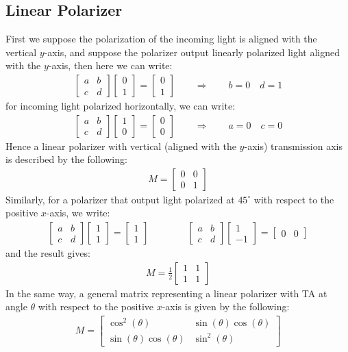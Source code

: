\documentclass[11pt]{book}
\theoremstyle{break}
\theoremstyle{break}
\newcommand{\bmat}[1]{\begin{bmatrix} #1 \end{bmatrix}}
\begin{document}
\subsection{Linear Polarizer}
First we suppose the polarization of the incoming light is aligned with the vertical $y$-axis, and suppose the polarizer output linearly polarized light aligned with the $y$-axis, then here we can write:
\begin{align*}
\bmat{a & b \\c &d}\bmat{0\\1} = \bmat{0 \\ 1}\qquad \Rightarrow \qquad b = 0 \quad d = 1
\end{align*}
for incoming light polarized horizontally, we can write:
\begin{align*}
\bmat{a & b \\c &d}\bmat{1\\0} = \bmat{0\\0} \qquad \Rightarrow \qquad a = 0 \quad c = 0
\end{align*}
Hence a linear polarizer with vertical (aligned with the $y$-axis)  transmission axis is described by the following:
\begin{align*}
M = \bmat{ 0 & 0 \\ 0 &1} \tag{linear polarizer, TA vertical}
\end{align*}
Similarly, for a polarizer that output light polarized at $45^\circ$ with respect to the positive $x$-axis, we write:
\begin{align*}
\bmat{a& b \\ c&d} \bmat{1 \\ 1} = \bmat{1\\ 1} \qquad\qquad \bmat{a&b \\ c&d }\bmat{1 \\ -1} = \bmat{0 & 0}
\end{align*}
and the result gives:
\begin{align*}
M = \frac{1}{2}\bmat{1 & 1 \\ 1&1} \tag{linear polarizer, TA at $45^\circ$ w.r.t +x-axis}
\end{align*}
In the same way, a general matrix representing a linear polarizer with TA at angle $\theta$ with respect to the positive $x$-axis is given by the following:
\begin{align*}
M = \bmat{\cos^2 (\theta) & \sin(\theta)\cos(\theta) \\ \sin(\theta) \cos(\theta) & \sin^2(\theta)} \tag{linear polarizer, TA at $\theta$ w.r.t. +x-axis}
\end{align*}
\end{document}
